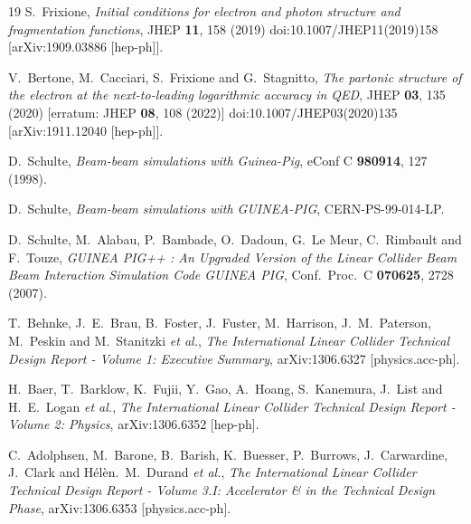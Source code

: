\documentclass[12pt]{book}
\begin{document}
\begin{thebibliography}{19}
S.~Frixione,
{\em Initial conditions for electron and photon structure and
  fragmentation functions}, 
JHEP \textbf{11}, 158 (2019)
doi:10.1007/JHEP11(2019)158
[arXiv:1909.03886 [hep-ph]].

V.~Bertone, M.~Cacciari, S.~Frixione and G.~Stagnitto,
{\em The partonic structure of the electron at the next-to-leading
  logarithmic accuracy in QED}, 
JHEP \textbf{03}, 135 (2020)
[erratum: JHEP \textbf{08}, 108 (2022)]
doi:10.1007/JHEP03(2020)135
[arXiv:1911.12040 [hep-ph]].

  D.~Schulte,
  {\em Beam-beam simulations with Guinea-Pig},
  eConf C {\bf 980914}, 127 (1998).

  D.~Schulte,
  {\em Beam-beam simulations with GUINEA-PIG},
  CERN-PS-99-014-LP.

  D.~Schulte, M.~Alabau, P.~Bambade, O.~Dadoun, G.~Le Meur, C.~Rimbault and F.~Touze,
  {\em GUINEA PIG++ : An Upgraded Version of the Linear Collider Beam
    Beam Interaction Simulation Code GUINEA PIG},
  Conf.\ Proc.\ C {\bf 070625}, 2728 (2007).

  T.~Behnke, J.~E.~Brau, B.~Foster, J.~Fuster, M.~Harrison, J.~M.~Paterson, M.~Peskin and M.~Stanitzki {\it et al.},
  {\em The International Linear Collider Technical Design Report -
    Volume 1: Executive Summary},
  arXiv:1306.6327 [physics.acc-ph].

  H.~Baer, T.~Barklow, K.~Fujii, Y.~Gao, A.~Hoang, S.~Kanemura, J.~List and H.~E.~Logan {\it et al.},
  {\em The International Linear Collider Technical Design Report -
    Volume 2: Physics},
  arXiv:1306.6352 [hep-ph].

  C.~Adolphsen, M.~Barone, B.~Barish, K.~Buesser, P.~Burrows, J.~Carwardine, J.~Clark and H\'{e}l\`{e}n.~M.~Durand {\it et al.},
  {\em The International Linear Collider Technical Design Report -
    Volume 3.I: Accelerator \& in the Technical Design Phase},
  arXiv:1306.6353 [physics.acc-ph].


\end{thebibliography}
\end{document}
